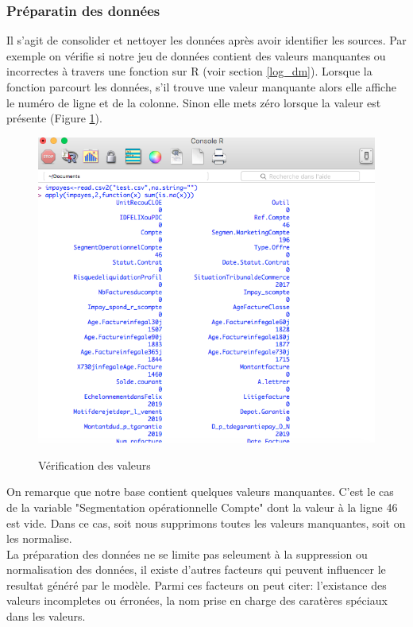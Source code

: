 \documentclass[11pt,a4paper]{report}
\begin{document}
\subsubsection{Préparatin des données}
Il s'agit de consolider et nettoyer les données après avoir identifier les sources. Par exemple on vérifie si notre jeu de données contient des valeurs manquantes ou incorrectes à travers une fonction sur R (voir section \ref{log_dm}).  
Lorsque la fonction parcourt les données, s'il trouve une valeur manquante alors elle affiche le numéro de ligne et de la colonne. Sinon elle mets zéro lorsque la valeur est présente (Figure \ref{figure11}).\\
\begin{figure}[h]
\centering
\includegraphics[scale=0.35]{manquantes.png}\\
\label{figure11}
\caption{Vérification des valeurs}
\end{figure}

On remarque que notre base contient quelques valeurs manquantes. C'est le cas de la variable "Segmentation opérationnelle Compte" dont la valeur à la ligne 46 est vide. Dans ce cas, soit nous supprimons toutes les valeurs manquantes, soit on les normalise.\\

La préparation des données ne se limite pas seleument à la suppression ou normalisation des données, il existe d'autres facteurs qui peuvent influencer le resultat généré par le modèle. Parmi ces facteurs on peut citer: l'existance des valeurs incompletes ou érronées, la nom prise en charge des caratères spéciaux dans les valeurs.
\end{document}
